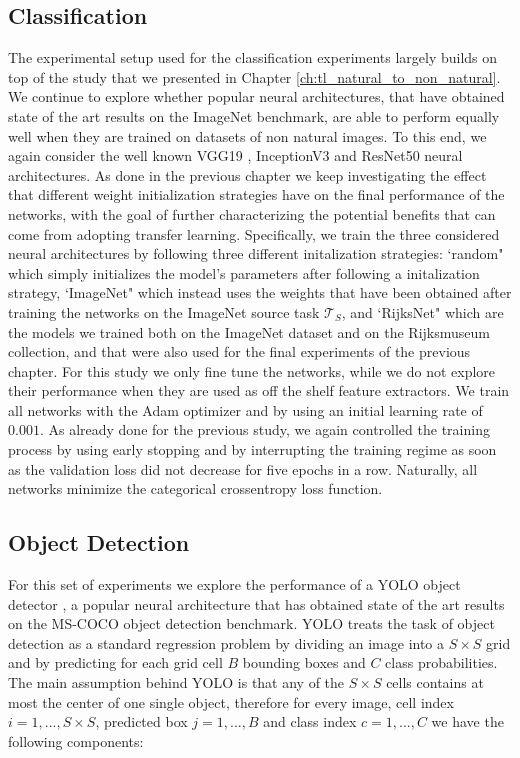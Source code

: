 \subsection{Classification}
The experimental setup used for the classification experiments largely builds on top of the study that we presented in Chapter \ref{ch:tl_natural_to_non_natural}. We continue to explore whether popular neural architectures, that have obtained state of the art results on the ImageNet benchmark, are able to perform equally well when they are trained on datasets of non natural images. To this end, we again consider the well known VGG19 \cite{simonyan2014very}, InceptionV3 \cite{szegedy2016rethinking} and ResNet50 \cite{xie2017aggregated} neural architectures. As done in the previous chapter we keep investigating the effect that different weight initialization strategies have on the final performance of the networks, with the goal of further characterizing the potential benefits that can come from adopting transfer learning. Specifically, we train the three considered neural architectures by following three different initalization strategies: `random" which simply initializes the model's parameters after following a initalization strategy, `ImageNet" which instead uses the weights that have been obtained after training the networks on the ImageNet source task $\mathcal{T}_S$, and `RijksNet" which are the models we trained both on the ImageNet dataset and on the Rijksmuseum collection, and that were also used for the final experiments of the previous chapter. For this study we only fine tune the networks, while we do not explore their performance when they are used as off the shelf feature extractors. We train all networks with the Adam optimizer \cite{kingma2014adam} and by using an initial learning rate of $0.001$. As already done for the previous study, we again controlled the training process by using early stopping and by interrupting the training regime as soon as the validation loss did not decrease for five epochs in a row. Naturally, all networks minimize the categorical crossentropy loss function.

\subsection{Object Detection}
\label{sec:object_detection_exp}

For this set of experiments we explore the performance of a YOLO object detector \cite{redmon2017yolo9000}, a popular neural architecture that has obtained state of the art results on the MS-COCO object detection benchmark. YOLO treats the task of object detection as a standard regression problem by dividing an image into a $S\times S$ grid and by predicting for each grid cell $B$ bounding boxes and $C$ class probabilities. The main assumption behind YOLO is that any of the $S\times S$ cells contains at most the center of one single object, therefore for every image, cell index $i=1,...,S\times S$, predicted box $j=1,...,B$ and class index $c=1,...,C$ we have the following components: 

